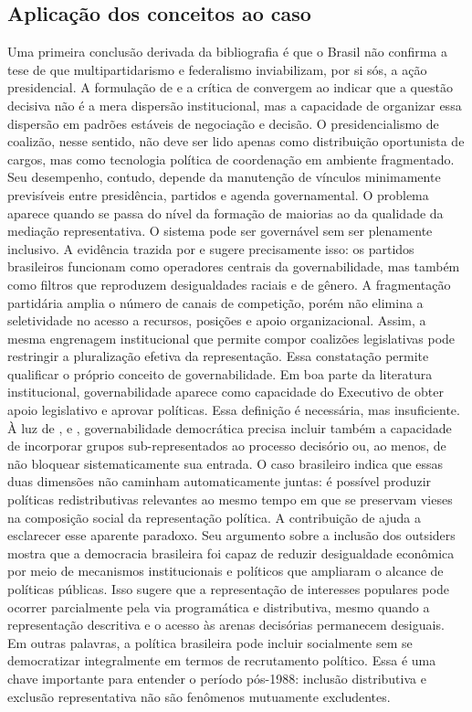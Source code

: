 \documentclass[12pt,a4paper]{article}
\begin{document}
\subsection{Aplicação dos conceitos ao caso}
\label{sec:orge7a99b9}
Uma primeira conclusão derivada da bibliografia é que o Brasil não confirma a tese de que multipartidarismo e federalismo inviabilizam, por si sós, a ação presidencial. A formulação de \textcite{palermo2000_como_se} e a crítica de \textcite{limongi2017_a_crise} convergem ao indicar que a questão decisiva não é a mera dispersão institucional, mas a capacidade de organizar essa dispersão em padrões estáveis de negociação e decisão. O presidencialismo de coalizão, nesse sentido, não deve ser lido apenas como distribuição oportunista de cargos, mas como tecnologia política de coordenação em ambiente fragmentado. Seu desempenho, contudo, depende da manutenção de vínculos minimamente previsíveis entre presidência, partidos e agenda governamental.
O problema aparece quando se passa do nível da formação de maiorias ao da qualidade da mediação representativa. O sistema pode ser governável sem ser plenamente inclusivo. A evidência trazida por \textcite{campos2017_o_que} e \textcite{sacchet2018_why_gender} sugere precisamente isso: os partidos brasileiros funcionam como operadores centrais da governabilidade, mas também como filtros que reproduzem desigualdades raciais e de gênero. A fragmentação partidária amplia o número de canais de competição, porém não elimina a seletividade no acesso a recursos, posições e apoio organizacional. Assim, a mesma engrenagem institucional que permite compor coalizões legislativas pode restringir a pluralização efetiva da representação.
Essa constatação permite qualificar o próprio conceito de governabilidade. Em boa parte da literatura institucional, governabilidade aparece como capacidade do Executivo de obter apoio legislativo e aprovar políticas. Essa definição é necessária, mas insuficiente. À luz de \textcite{arretche2018_democracia_e}, \textcite{campos2017_o_que} e \textcite{gatto2025_resistance_to}, governabilidade democrática precisa incluir também a capacidade de incorporar grupos sub-representados ao processo decisório ou, ao menos, de não bloquear sistematicamente sua entrada. O caso brasileiro indica que essas duas dimensões não caminham automaticamente juntas: é possível produzir políticas redistributivas relevantes ao mesmo tempo em que se preservam vieses na composição social da representação política.
A contribuição de \textcite{arretche2018_democracia_e} ajuda a esclarecer esse aparente paradoxo. Seu argumento sobre a inclusão dos outsiders mostra que a democracia brasileira foi capaz de reduzir desigualdade econômica por meio de mecanismos institucionais e políticos que ampliaram o alcance de políticas públicas. Isso sugere que a representação de interesses populares pode ocorrer parcialmente pela via programática e distributiva, mesmo quando a representação descritiva e o acesso às arenas decisórias permanecem desiguais. Em outras palavras, a política brasileira pode incluir socialmente sem se democratizar integralmente em termos de recrutamento político. Essa é uma chave importante para entender o período pós-1988: inclusão distributiva e exclusão representativa não são fenômenos mutuamente excludentes.
\end{document}
